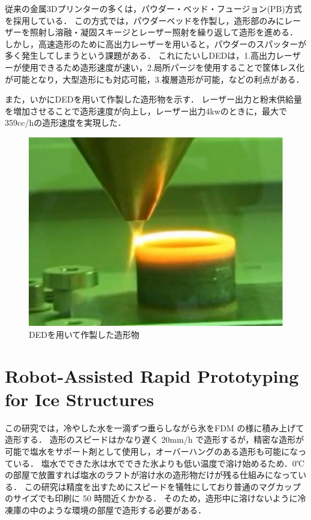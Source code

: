従来の金属3Dプリンターの多くは，パウダー・ベッド・フュージョン(PB)方式を採用している．
この方式では，パウダーベッドを作製し，造形部のみにレーザーを照射し溶融・凝固スキージとレーザー照射を繰り返して造形を進める．
しかし，高速造形のために高出力レーザーを用いると，パウダーのスパッターが多く発生してしまうという課題がある．
これにたいしDEDは，1.高出力レーザーが使用できるため造形速度が速い，2.局所パージを使用することで筐体レス化が可能となり，大型造形にも対応可能，3.複層造形が可能，などの利点がある．

また，いかにDEDを用いて作製した造形物を示す．
レーザー出力と粉末供給量を増加させることで造形速度が向上し，レーザー出力4kwのときに，最大で359cc/hの造形速度を実現した．

\begin{figure}[H]
  \centering
  \includegraphics[width=11truecm]{./fig/kinnzoku2.jpg}
  \caption{DEDを用いて作製した造形物}
  \label{fig:ferret}
\end{figure}



\section{Robot-Assisted Rapid Prototyping for Ice Structures\cite{ss}}
\label{sec:enum}
この研究では，冷やした水を一滴ずつ垂らしながら氷をFDM の様に積み上げて造形する．
造形のスピードはかなり遅く 20mm/h で造形するが，精密な造形が可能で塩水をサポート剤として使用し，オーバーハングのある造形も可能になっている．
塩水でできた氷は水でできた氷よりも低い温度で溶け始めるため．0℃ の部屋で放置すれば塩水のラフトが溶け水の造形物だけが残る仕組みになっている．
この研究は精度を出すためにスピードを犠牲にしており普通のマグカップのサイズでも印刷に 50 時間近くかかる．
そのため，造形中に溶けないように冷凍庫の中のような環境の部屋で造形する必要がある．


